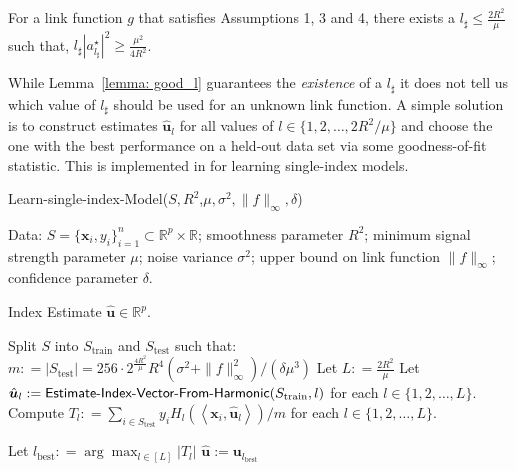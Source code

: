 \documentclass[final,12pt]{colt2018} %
\newcommand{\R}{\mathbb{R}}
\renewcommand\v[1]{{\ensuremath{\boldsymbol{#1}}}}
\newcommand\ip[1]{\left\langle #1 \right\rangle}
\begin{document}
\begin{lemma} For a link function $g$ that satisfies Assumptions 1, 3 and 4, there exists a $l_\sharp \leq \frac{2R^2}{\mu}$ such that, $l_\sharp |a_{l_\sharp}^\star|^2 \geq \frac{\mu^2}{4R^2}$. 
\label{lemma: good_l}
\end{lemma}

While Lemma~\ref{lemma: good_l} guarantees the \emph{existence} of a $l_\sharp$ it does not tell us which value of $l_\sharp$ should be used for an unknown link function. A simple solution is to construct estimates $\hat{\v u}_l$ for all values of $l \in \{1,2, \dotsc, 2R^2/\mu\}$ and choose the one with the best performance on a held-out data set via some goodness-of-fit statistic. This is implemented in  for learning single-index models.
\begin{algorithm}[t]
  \renewcommand\algorithmicrequire{\textbf{Input\newline}}
  \renewcommand\algorithmicensure{\textbf{Output}}
  \caption{\textsf{Learn-single-index-Model($S,R^2$,$\mu,\sigma^2, \|f\|_\infty, \delta$)}}
  \begin{algorithmic}[1]
    \REQUIRE
    Data: $S=\{\v x_i, y_i\}_{i=1}^n \subset \R^p \times \R$; \newline
    smoothness parameter $R^2$; %
    minimum signal strength parameter $\mu$; %
    noise variance $\sigma^2$; %
    upper bound on link function $\|f\|_\infty$; %
    confidence parameter $\delta$.

    \renewcommand\algorithmicrequire{\textbf{assume}}
    
    \ENSURE
    Index Estimate $\hat{\v u} \in \R^p$.

    \STATE Split $S$ into $S_{\text{train}}$ and $S_{\text{test}}$  such that: $m: = |S_{\text{test}}| = 256 \cdot 2^\frac{4R^2}{\mu} R^4 (\sigma^2 + \|f\|_\infty^2)/(\delta \mu^3)$
    \STATE Let $L: = \frac{2R^2}{\mu}$
    \STATE Let $\hat{\v u}_l := \text{\textsf{Estimate-Index-Vector-From-Harmonic}}(S_\text{train},l)$ for each $l \in \{1,2,\dotsc,L\}$.
    \STATE Compute
        $T_l: = \sum_{i \in S_{\text{test}}}y_i H_l(\ip{\v x_i,  \hat{\v u}_l}) / m$ for each $l \in \{1,2,\dots,L\}$.

    \STATE Let $l_\text{best}: = \arg\max_{l \in [L]} |T_l|$
    \RETURN  $\hat{\v u} := \v u_{l_\text{best}}$
  \end{algorithmic}
\label{algorithm: learn_sims}
\end{algorithm}
\end{document}
